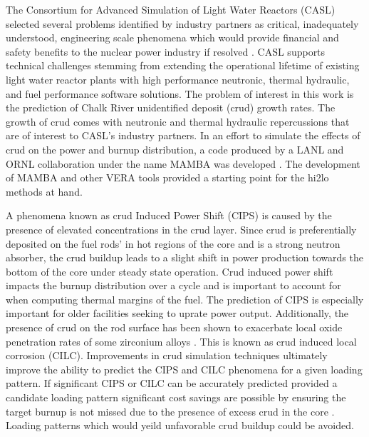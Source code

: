 
The Consortium for Advanced Simulation of Light Water Reactors (CASL) selected several problems identified by industry partners as critical, inadequately understood, engineering scale phenomena which would provide
financial and safety benefits to the nuclear power industry if resolved \cite{Turinsky15}.  CASL supports technical challenges stemming from extending the operational lifetime of existing light water reactor plants with high performance neutronic, thermal hydraulic, and fuel performance software solutions.
The problem of
interest in this work is the prediction of Chalk River unidentified deposit
(crud) growth rates.  The growth of crud comes with neutronic and thermal
hydraulic repercussions that are of interest to CASL's industry partners.
In an effort to simulate the
effects of crud on the power and burnup distribution, a code produced by a LANL
and ORNL collaboration under the name MAMBA was developed  \cite{collins16}.
The development of MAMBA and other VERA tools provided a starting point for the hi2lo methods at hand.
 

A phenomena known as crud Induced Power Shift (CIPS) is caused by the presence
of elevated  concentrations in the crud layer.  Since crud is preferentially
deposited on the fuel rods' in hot regions of the core and  is a strong neutron absorber, the crud buildup leads to a slight shift in
power production towards the bottom of the core under steady state operation.
Crud induced power shift impacts the burnup distribution over a cycle
and is important to account for when computing thermal
margins of the fuel.  The prediction
of CIPS is especially important for older facilities seeking to uprate power
output.  Additionally, the presence of crud on the rod surface has been shown
to exacerbate local oxide penetration rates of some zirconium alloys \cite{adamson07}.
This is known as crud induced local corrosion (CILC).  Improvements in crud
simulation techniques ultimately improve the ability to predict the CIPS and
CILC phenomena for a given loading pattern.  If significant CIPS or CILC can be accurately predicted provided a candidate loading pattern significant cost savings are possible by ensuring the target burnup is not missed due to the presence of excess crud in the core \cite{lange2017}.  Loading patterns which would yeild unfavorable crud buildup could be avoided.
  

